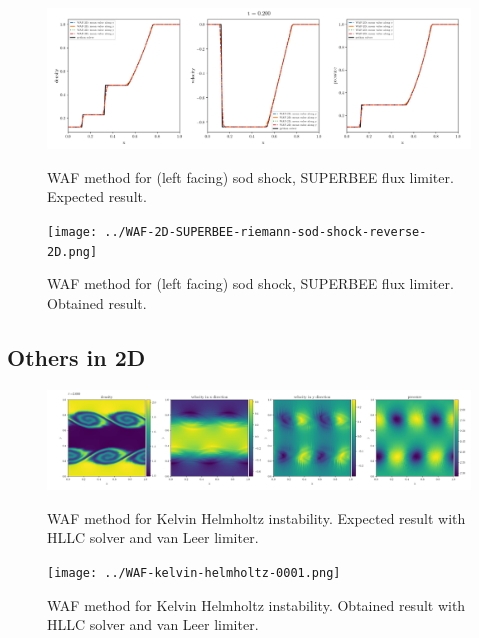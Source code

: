     \begin{figure}[htbp]
        \centering
        \includegraphics[width=.9\textwidth]{./figures/WAF-2D-SUPERBEE-riemann-sod-shock-reverse-2D.png}%
        \caption{WAF method for (left facing) sod shock, SUPERBEE flux limiter. Expected result.}
        \texttt{[image: ../WAF-2D-SUPERBEE-riemann-sod-shock-reverse-2D.png]}%
        \caption{WAF method for (left facing) sod shock, SUPERBEE flux limiter. Obtained result.}
    \end{figure}







\clearpage
\subsection{Others in 2D}

    \begin{figure}[htbp]
        \centering
        \includegraphics[width=.9\textwidth]{./figures/WAF-kelvin-helmholtz-0001.png}%
        \caption{WAF method for Kelvin Helmholtz instability. Expected result with HLLC solver and van Leer limiter.}
        \texttt{[image: ../WAF-kelvin-helmholtz-0001.png]}%
        \caption{WAF method for Kelvin Helmholtz instability. Obtained result with HLLC solver and van Leer limiter.}
    \end{figure}














\clearpage
